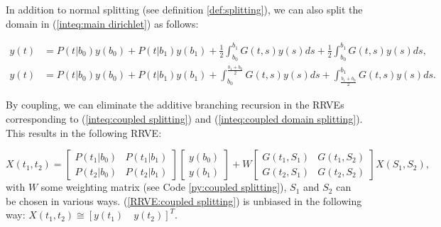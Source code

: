 \documentclass[a4paper,12pt]{article}
\begin{document}
\begin{example} \label{ex:coupled splitting}
    In addition to normal splitting (see definition \ref{def:splitting}),
    we can also split the domain in (\ref{inteq:main dirichlet})
    as follows:

    \begin{align}\label{inteq:coupled splitting}
        y(t) & = P(t|b_{0}) y(b_{0}) + P(t|b_{1}) y(b_{1}) +
        \frac{1}{2} \int_{b_{0}}^{b_{1}} G(t,s)y(s) ds +
        \frac{1}{2} \int_{b_{0}}^{b_{1}} G(t,s)y(s) ds,                                             \\
        y(t) & = P(t|b_{0}) y(b_{0}) + P(t|b_{1}) y(b_{1}) + \label{inteq:coupled domain splitting}
        \int_{b_{0}}^{\frac{b_{1}+b_{0}}{2}} G(t,s)y(s) ds +
        \int_{\frac{b_{1}+b_{0}}{2}}^{b_{1}} G(t,s)y(s) ds.
    \end{align}

    By coupling, we can eliminate the additive branching recursion
    in the RRVEs corresponding to (\ref{inteq:coupled splitting})
    and (\ref{inteq:coupled domain splitting}).
    This results in the following RRVE:

    \begin{equation} \label{RRVE:coupled splitting}
        X(t_{1},t_{2})=
        \begin{bmatrix}
            P(t_{1}|b_{0}) & P(t_{1}|b_{1}) \\
            P(t_{2}|b_{0}) & P(t_{2}|b_{1})
        \end{bmatrix}
        \begin{bmatrix}
            y(b_{0}) \\
            y(b_{1})
        \end{bmatrix}
        +
        W
        \begin{bmatrix}
            G(t_{1},S_{1}) & G(t_{1},S_{2}) \\
            G(t_{2},S_{1}) & G(t_{2},S_{2})
        \end{bmatrix}
        X(S_{1},S_{2}),
    \end{equation}
    with $W$ some weighting matrix
    (see Code \ref{py:coupled splitting}),
    $S_{1}$ and $S_{2}$ can be chosen
    in various ways. (\ref{RRVE:coupled splitting}) is unbiased in the following way:
    $X(t_{1},t_{2}) \cong [y(t_{1}) \quad y(t_{2})]^{T}$.

\end{example}
\end{document}
